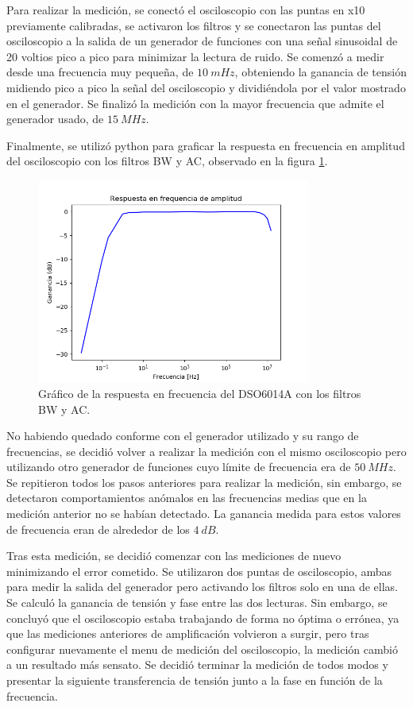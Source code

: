 \documentclass[11pt, a4paper]{article}
\begin{document}
Para realizar la medición, se conectó el osciloscopio con las puntas en x10 previamente calibradas, se activaron los filtros y se conectaron las puntas del osciloscopio a la salida de un generador de funciones con una señal sinusoidal de 20 voltios pico a pico para minimizar la lectura de ruido. Se comenzó a medir desde una frecuencia muy pequeña, de $10 \ mHz$, obteniendo la ganancia de tensión midiendo pico a pico la señal del osciloscopio y dividiéndola por el valor mostrado en el generador. Se finalizó la medición con la mayor frecuencia que admite el generador usado, de $15 \ MHz$.

Finalmente, se utilizó python para graficar la respuesta en frecuencia en amplitud del osciloscopio con los filtros BW y AC, observado en la figura \ref{graf:resp_freq_osci}.

\begin{figure}[H]
	\centering
	\includegraphics[width=0.8\textwidth]{resp_freq_osci.png}
	\caption{Gráfico de la respuesta en frecuencia del DSO6014A con los filtros BW y AC.} 
	\label{graf:resp_freq_osci}
\end{figure}

No habiendo quedado conforme con el generador utilizado y su rango de frecuencias, se decidió volver a realizar la medición con el mismo osciloscopio pero utilizando otro generador de funciones cuyo límite de frecuencia era de $50 \ MHz$. Se repitieron todos los pasos anteriores para realizar la medición, sin embargo, se detectaron comportamientos anómalos en las frecuencias medias que en la medición anterior no se habían detectado. La ganancia medida para estos valores de frecuencia eran de alrededor de los $4 \ dB$.

Tras esta medición, se decidió comenzar con las mediciones de nuevo minimizando el error cometido. Se utilizaron dos puntas de osciloscopio, ambas para medir la salida del generador pero activando los filtros solo en una de ellas. Se calculó la ganancia de tensión y fase entre las dos lecturas. Sin embargo, se concluyó que el osciloscopio estaba trabajando de forma no óptima o errónea, ya que las mediciones anteriores de amplificación volvieron a surgir, pero tras configurar nuevamente el menu de medición del osciloscopio, la medición cambió a un resultado más sensato. Se decidió terminar la medición de todos modos y presentar la siguiente transferencia de tensión junto a la fase en función de la frecuencia.
\end{document}
